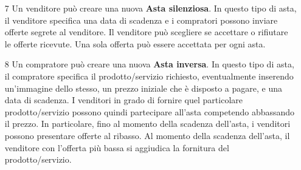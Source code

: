\begin{itemize}
            \item[7] Un venditore può creare una nuova \textbf{Asta silenziosa}. In questo tipo di asta, il venditore specifica una data di scadenza e i compratori possono inviare offerte segrete al venditore. Il venditore può scegliere se accettare o rifiutare le offerte ricevute. Una sola offerta può essere accettata per ogni asta.
            
            \item[8] Un compratore può creare una nuova \textbf{Asta inversa}. In questo tipo di asta, il compratore specifica il prodotto/servizio richiesto, eventualmente inserendo un’immagine dello stesso, un prezzo iniziale che è disposto a pagare, e una data di scadenza. I venditori in grado di fornire quel particolare prodotto/servizio possono quindi partecipare all’asta competendo abbassando il prezzo. In particolare, fino al momento della scadenza dell’asta, i venditori possono presentare offerte al ribasso. Al momento della scadenza dell’asta, il venditore con l’offerta più bassa si aggiudica la fornitura del prodotto/servizio.
        \end{itemize}